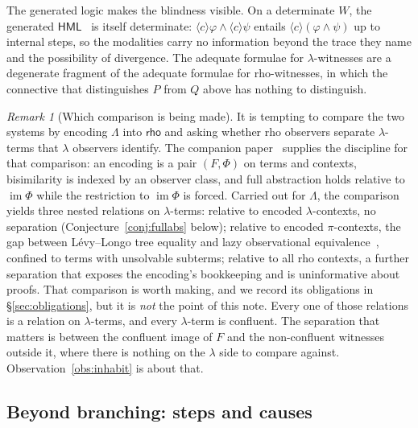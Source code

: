 \documentclass[11pt]{article}
\theoremstyle{plain}
\theoremstyle{definition}
\theoremstyle{remark}
\newtheorem{remark}[theorem]{Remark}
\newcommand{\Lam}{\Lambda}
\newcommand{\rhoc}{\textsf{rho}}
\newcommand{\HML}{\textsf{HML}}
\newcommand{\dia}[1]{\langle #1 \rangle}
\begin{document}
The generated logic makes the blindness visible. On a determinate $W$, the
generated $\HML$~\cite{Extension} is itself determinate: $\dia{c}\varphi
\wedge \dia{c}\psi$ entails $\dia{c}(\varphi \wedge \psi)$ up to internal
steps, so the modalities carry no information beyond the trace they name and
the possibility of divergence. The adequate formulae for $\lambda$-witnesses
are a degenerate fragment of the adequate formulae for rho-witnesses, in which
the connective that distinguishes $P$ from $Q$ above has nothing to
distinguish.

\begin{remark}[Which comparison is being made]
It is tempting to compare the two systems by encoding $\Lam$ into $\rhoc$ and
asking whether rho observers separate $\lambda$-terms that $\lambda$ observers
identify. The companion paper~\cite{NoWNS} supplies the discipline for that
comparison: an encoding is a pair $(F,\Phi)$ on terms and contexts, bisimilarity
is indexed by an observer class, and full abstraction holds relative to
$\operatorname{im}\Phi$ while the restriction to $\operatorname{im}\Phi$ is
forced. Carried out for $\Lam$, the comparison yields three nested relations on
$\lambda$-terms: relative to encoded $\lambda$-contexts, no separation
(Conjecture~\ref{conj:fullabs} below); relative to encoded $\pi$-contexts, the
gap between L\'evy--Longo tree equality and lazy observational
equivalence~\cite{Sangiorgi94,Lassen99}, confined to terms with unsolvable
subterms; relative to all rho contexts, a further separation that exposes the
encoding's bookkeeping and is uninformative about proofs. That comparison is
worth making, and we record its obligations in \S\ref{sec:obligations}, but it
is \emph{not} the point of this note. Every one of those relations is a
relation on $\lambda$-terms, and every $\lambda$-term is confluent. The
separation that matters is between the confluent image of $F$ and the
non-confluent witnesses outside it, where there is nothing on the $\lambda$
side to compare against. Observation~\ref{obs:inhabit} is about that.
\end{remark}

\subsection{Beyond branching: steps and causes}
\end{document}
